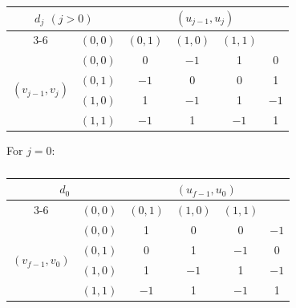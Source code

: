 \documentclass{article}
\numberwithin{equation}{section}
\begin{document}
\begin{table}[H]
    \centering
    \caption{}
    \label{table1} %
    \begin{tabular}{|c|c|c|c|c|c|}
        \hline
        \multicolumn{2}{|c|}{\multirow{2}{*}{$d_j$ $(j>0)$}} & \multicolumn{4}{c|}{$(u_{j-1}, u_j)$} \\ \cline{3-6} 
        
        \multicolumn{2}{|c|}{} & $(0,0)$ & $(0,1)$ & $(1,0)$ & $(1,1)$ \\ \hline
        
        \multirow{4}{*}{$(v_{j-1}, v_j)$} & $(0,0)$ & 0 & $-1$ & 1 & 0 \\ \cline{2-6} 
                                          & $(0,1)$ & $-1$ & 0 & 0 & 1 \\ \cline{2-6} 
                                          & $(1,0)$ & 1 & $-1$ & 1 & $-1$ \\ \cline{2-6} 
                                          & $(1,1)$ & $-1$ & 1 & $-1$ & 1 \\ \hline
    \end{tabular}
\end{table}

For $j=0$:
\begin{table}[H]
    \centering
    \caption{}
    \label{table2}
    \begin{tabular}{|c|c|c|c|c|c|}
        \hline
        \multicolumn{2}{|c|}{\multirow{2}{*}{$d_0$}} & \multicolumn{4}{c|}{$(u_{f-1}, u_0)$} \\ \cline{3-6} 
        
        \multicolumn{2}{|c|}{} & $(0,0)$ & $(0,1)$ & $(1,0)$ & $(1,1)$ \\ \hline
        
        \multirow{4}{*}{$(v_{f-1}, v_0)$} & $(0,0)$ & 1 & 0 & 0 & $-1$ \\ \cline{2-6} 
                                          & $(0,1)$ & 0 & 1 & $-1$ & 0 \\ \cline{2-6} 
                                          & $(1,0)$ & 1 & $-1$ & 1 & $-1$ \\ \cline{2-6} 
                                          & $(1,1)$ & $-1$ & 1 & $-1$ & 1 \\ \hline
    \end{tabular}
\end{table}
\end{document}

